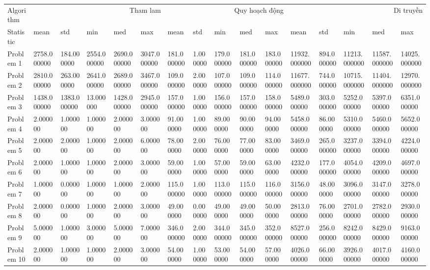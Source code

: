 \begin{tabular}{llllllllllllllll}
\toprule
Algorithm & \multicolumn{5}{r}{Tham lam} & \multicolumn{5}{r}{Quy hoạch động} & \multicolumn{5}{r}{Di truyền} \\
Statistic & mean & std & min & med & max & mean & std & min & med & max & mean & std & min & med & max \\
\midrule
Problem 1 & 2758.000000 & 184.000000 & 2554.000000 & 2690.000000 & 3047.000000 & 181.000000 & 1.000000 & 179.000000 & 181.000000 & 183.000000 & 11932.000000 & 894.000000 & 11213.000000 & 11587.000000 & 14025.000000 \\
Problem 2 & 2810.000000 & 263.000000 & 2641.000000 & 2689.000000 & 3467.000000 & 109.000000 & 2.000000 & 107.000000 & 109.000000 & 114.000000 & 11677.000000 & 744.000000 & 10715.000000 & 11404.000000 & 12970.000000 \\
Problem 3 & 1438.000000 & 1383.000000 & 13.000000 & 1428.000000 & 2945.000000 & 157.000000 & 1.000000 & 156.000000 & 157.000000 & 158.000000 & 5489.000000 & 303.000000 & 5252.000000 & 5397.000000 & 6351.000000 \\
Problem 4 & 2.000000 & 1.000000 & 1.000000 & 2.000000 & 3.000000 & 91.000000 & 1.000000 & 89.000000 & 90.000000 & 94.000000 & 5458.000000 & 86.000000 & 5310.000000 & 5460.000000 & 5652.000000 \\
Problem 5 & 2.000000 & 2.000000 & 1.000000 & 2.000000 & 6.000000 & 78.000000 & 2.000000 & 76.000000 & 77.000000 & 83.000000 & 3469.000000 & 265.000000 & 3237.000000 & 3394.000000 & 4224.000000 \\
Problem 6 & 2.000000 & 1.000000 & 1.000000 & 2.000000 & 3.000000 & 59.000000 & 1.000000 & 57.000000 & 59.000000 & 63.000000 & 4232.000000 & 177.000000 & 4054.000000 & 4209.000000 & 4697.000000 \\
Problem 7 & 1.000000 & 0.000000 & 1.000000 & 1.000000 & 2.000000 & 115.000000 & 1.000000 & 113.000000 & 115.000000 & 116.000000 & 3156.000000 & 48.000000 & 3096.000000 & 3147.000000 & 3278.000000 \\
Problem 8 & 2.000000 & 0.000000 & 1.000000 & 2.000000 & 3.000000 & 49.000000 & 0.000000 & 49.000000 & 49.000000 & 50.000000 & 2813.000000 & 76.000000 & 2701.000000 & 2782.000000 & 2930.000000 \\
Problem 9 & 5.000000 & 1.000000 & 3.000000 & 5.000000 & 7.000000 & 346.000000 & 2.000000 & 344.000000 & 345.000000 & 352.000000 & 8527.000000 & 256.000000 & 8242.000000 & 8429.000000 & 9163.000000 \\
Problem 10 & 2.000000 & 1.000000 & 1.000000 & 2.000000 & 3.000000 & 54.000000 & 1.000000 & 53.000000 & 54.000000 & 57.000000 & 4026.000000 & 66.000000 & 3926.000000 & 4017.000000 & 4160.000000 \\
\bottomrule
\end{tabular}
